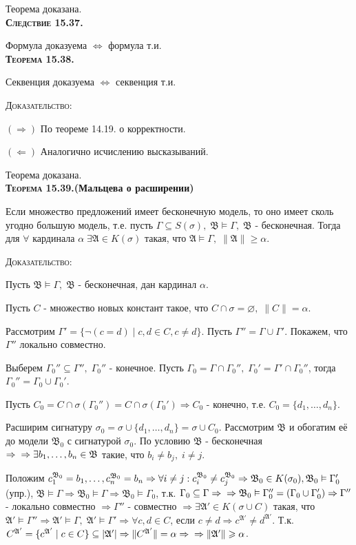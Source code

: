 \documentclass[18pt, a4paper]{extarticle}
\newcommand{\Gm}{\Gamma}
\newcommand{\vD}{\vDash}
\newcommand{\mA}{\mathfrak{A}}
\newcommand{\mB}{\mathfrak{B}}
\newcommand{\dok}{\textsc{Доказательство:}}
\begin{document}
Теорема доказана.\\

\textbf{\textsc{Следствие 15.37.}} 

Формула доказуема $\Leftrightarrow$ формула т.и.\\

\textbf{\textsc{Теорема 15.38.}} 

Секвенция доказуема $\Leftrightarrow$ секвенция т.и.

\dok

$\boxed{(\Rightarrow)}$ По теореме 14.19. о корректности.

$\boxed{(\Leftarrow)}$ Аналогично исчислению высказываний.

Теорема доказана.\\

\textbf{\textsc{Теорема 15.39.}(Мальцева о расширении)} 

Если множество предложений имеет бесконечную модель, то оно имеет сколь угодно большую модель, т.е. пусть $\Gm\subseteq S(\sigma),\;\mB\vD\Gm,\;\mB$ - бесконечная. Тогда для $\forall$ кардинала $\alpha\;\exists\mA\in K(\sigma)$ такая, что $\mA\vD\Gm,\;\|\mA\|\geqslant\alpha$.

\dok

Пусть $\mB\vD\Gm,\;\mB$ - бесконечная, дан кардинал $\alpha$.

Пусть $C$ -  множество новых констант такое, что $C\cap\sigma=\varnothing,\;\|C\|=\alpha$.

Рассмотрим $\Gm'=\{\lnot(c=d)\;|\;c,d\in C,c\neq d\}$. Пусть $\Gm''=\Gm\cup\Gm'$. Покажем, что $\Gm''$ локально совместно.

Выберем $\Gm_0''\subseteq\Gm'',\;\Gm_0''$ - конечное. Пусть $\Gm_0=\Gm\cap\Gm_0'',\;\Gm_0'=\Gm'\cap\Gm_0''$, тогда $\Gm_0''=\Gm_0\cup\Gm_0'$.

Пусть $C_0=C\cap\sigma(\Gm_0'')=C\cap\sigma(\Gm_0')\Rightarrow C_0$ - конечно, т.е. $C_0=\{d_1,\dots,d_n\}$. 

Расширим сигнатуру $\sigma_0=\sigma\cup\{d_1,\dots,d_n\}=\sigma\cup C_0$. Рассмотрим $\mB$ и обогатим её до модели $\mB_0$ с сигнатурой $\sigma_0$. По условию $\mB$ - бесконечная $\Rightarrow\newline\Rightarrow\exists b_1,\dots,b_n\in\mB$ такие, что $b_i\neq b_j,\;i\neq j$. 

Положим $c_1^{\mB_0}=b_1,\dots,c_n^{\mB_0}=b_n\Rightarrow\forall i\neq j: c_i^{\mB_0}\neq c_j^{\mB_0}\Rightarrow \mB_0\in K(\sigma_0),\newline\mB_0\vD\Gm_0'$(упр.), $\mB\vD\Gm\Rightarrow\mB_0\vD\Gm\Rightarrow\mB_0\vD\Gm_0$, т.к. $\Gm_0\subseteq\Gm\Rightarrow\newline\Rightarrow\mB_0\vD\Gm_0''=(\Gm_0\cup\Gm_0')\Rightarrow\Gm''$ - локально совместно $\Rightarrow\Gm''$ - совместно $\Rightarrow\exists\mA'\in K(\sigma\cup C)$ такая, что $\mA'\vD\Gm''\Rightarrow\mA'\vD\Gm,\;\mA'\vD\Gm'\Rightarrow\forall c,d\in C$, если $c\neq d\Rightarrow c^{\mA'}\neq d^{\mA'}$. Т.к. $C^{\mA'}=\{c^{\mA'}\;|\;c\in C\}\subseteq|\mA'|\Rightarrow\|C^{\mA'}\|=\alpha\Rightarrow\newline\Rightarrow\|\mA'\|\geqslant\alpha$.
\end{document}
